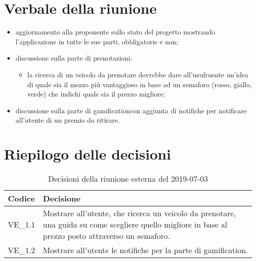 \section{Verbale della riunione}
\begin{itemize}
	\item aggiornamento alla proponente sullo stato del progetto mostrando l'applicazione in tutte le sue parti, obbligatorie e non;
	\item discussione sulla parte di prenotazioni:
	\begin{itemize}
		\item la ricerca di un veicolo da prenotare dovrebbe dare all'usufruente un'idea di quale sia il mezzo più vantaggioso in base ad un semaforo (rosso, giallo, verde) che indichi quale sia il prezzo migliore; 
	\end{itemize}
	\item discussione sulla parte di gamification\glosp con aggiunta di notifiche per notificare all'utente di un premio da ritirare.
\end{itemize}	 

\section{Riepilogo delle decisioni}

	
	\begin{longtable}{ >{\centering}p{} >{}p{}}
		\caption{Decisioni della riunione esterna del 2019-07-03}\\	
		\rowcolorhead
		\textbf{\color{white}Codice} 
		& \centering\textbf{\color{white}Decisione} 
		\tabularnewline 
		\endfirsthead
		VE\_1.1 & Mostrare all'utente, che ricerca un veicolo da prenotare, una guida su come scegliere quello migliore in base al prezzo posto attraverso un semaforo.
		
		\tabularnewline 
		VE\_1.2 & Mostrare all'utente le notifiche per la parte di gamification\glo.
	\end{longtable}
	




